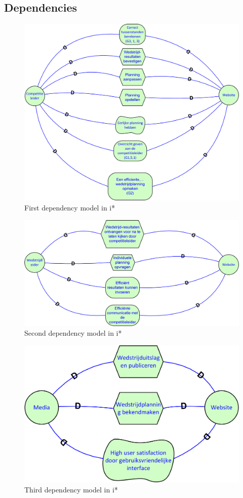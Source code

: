 \documentclass[12pt,a4paper]{article}
\begin{document}
			\subsection{Dependencies}
			\begin{figure}[H]
			\includegraphics[width=\textwidth]{../2-Doelen/istar1.png}
			\caption{First dependency model in i*}
			\end{figure}
			\begin{figure}[H]
				\includegraphics[width=\textwidth]{../2-Doelen/istar2.png}
				\caption{Second dependency model in i*}
			\end{figure}
			\begin{figure}[H]
				\includegraphics[width=\textwidth]{../2-Doelen/istar3.png}
				\caption{Third dependency model in i*}
			\end{figure}
\end{document}
